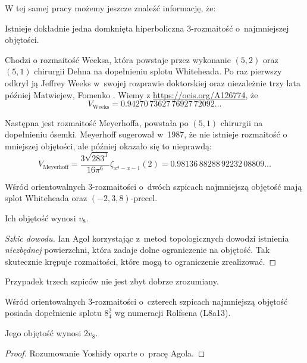 W tej samej pracy możemy jeszcze znaleźć informację, że:

\begin{proposition}
    Istnieje dokładnie jedna domknięta hiperboliczna 3-rozmaitość o~najmniejszej objętości.
\end{proposition}

Chodzi o rozmaitość Weeksa, która powstaje przez wykonanie $(5, 2)$ oraz $(5, 1)$ chirurgii Dehna na dopełnieniu splotu Whiteheada.
%
%
%
Po raz pierwszy odkrył ją Jeffrey Weeks \cite{weeks85} w~swojej rozprawie doktorskiej oraz niezależnie trzy lata później Matwiejew, Fomenko \cite{fomenko88}.
%
%
%
Wiemy z \url{https://oeis.org/A126774}, że
\begin{equation}
    V_{\textrm{Weeks}} = 0.94270 \, 73627 \, 76927 \, 72092 \ldots
\end{equation}

Następna jest rozmaitość Meyerhoffa, powstała po $(5, 1)$ chirurgii na dopełnieniu ósemki.
Meyerhoff sugerował w~1987, że nie istnieje rozmaitość o mniejszej objętości, ale później okazało się to nieprawdą: 
\begin{equation}
    V_{\textrm{Meyerhoff}} = \frac{ 3 \sqrt{283^3} } {16 \pi^6} \zeta_{x^4-x-1}(2) = 0.98136 \, 88288 \, 92232 \, 08809 \ldots
\end{equation}

\begin{proposition}
    Wśród orientowalnych 3-rozmaitości o~dwóch szpicach najmniejszą objętość mają splot Whiteheada oraz $(-2, 3, 8)$-precel.
%
%
\end{proposition}


Ich objętość wynosi $v_8$.

\begin{proof}[Szkic dowodu]
%
    Ian Agol \cite{agol10} korzystając z~metod topologicznych dowodzi istnienia \emph{niezbędnej} powierzchni, która zadaje dolne ograniczenie na objętość.
    Tak skutecznie krępuje rozmaitości, które mogą to ograniczenie zrealizować.
\end{proof}

Przypadek trzech szpiców nie jest zbyt dobrze zrozumiany.

\begin{proposition}
    Wśród orientowalnych 3-rozmaitości o~czterech szpicach najmniejszą objętość posiada dopełnienie splotu $8_4^2$ wg numeracji Rolfsena (L8a13).
\end{proposition}

Jego objętość wynosi $2v_8$.

\begin{proof}
%
    Rozumowanie Yoshidy \cite{yoshida13} oparte o~pracę Agola.
\end{proof}

%


